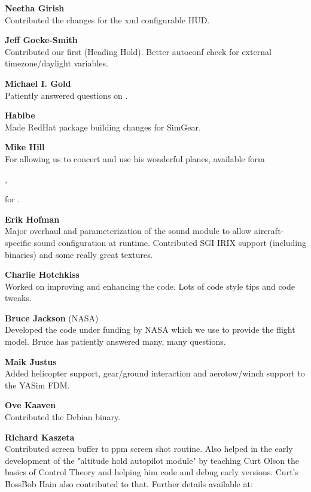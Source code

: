 \noindent \textbf{Neetha Girish}\\
  Contributed the changes for the xml configurable HUD.
 \medskip

\noindent \textbf{Jeff Goeke-Smith}\\
  Contributed our first  (Heading Hold).
  Better autoconf check for external timezone/daylight variables.
 \medskip

\noindent \textbf{Michael I. Gold}\\
 Patiently answered questions on .
 \medskip

\noindent \textbf{Habibe}\\
 Made RedHat package building changes for SimGear.
 \medskip

\noindent \textbf{Mike Hill}\\
 For allowing us to concert and use his wonderful planes, available form
 \medskip

 ,

 \noindent
 for \FlightGear{}.
 \medskip

\noindent \textbf{Erik Hofman}\\
  Major overhaul and parameterization of the sound module to allow
  aircraft-specific sound configuration at runtime.
  Contributed SGI IRIX support (including binaries) and some really great
  textures.
 \medskip

\noindent \textbf{Charlie Hotchkiss}\\
Worked on improving and enhancing the  code.
Lots of code style tips and code tweaks.
 \medskip

\noindent \textbf{Bruce Jackson} (NASA)\\
   Developed the  code under funding by NASA which we use to provide the
   flight model. Bruce has patiently answered many, many questions.
  \medskip

\noindent \textbf{Maik Justus} \\
  Added helicopter support, gear/ground interaction and aerotow/winch support
  to the YASim FDM.
  \medskip

\noindent \textbf{Ove Kaaven} \\
 Contributed the Debian binary.
 \medskip

\noindent \textbf{Richard Kaszeta} \\
  Contributed screen buffer to ppm screen shot routine.
  Also helped in the early development of the "altitude
  hold autopilot module" by teaching Curt Olson the basics of Control Theory
  and helping him code and debug early versions. Curt's \'Boss\' Bob Hain
  also contributed to that.  Further details available at:
 \medskip

